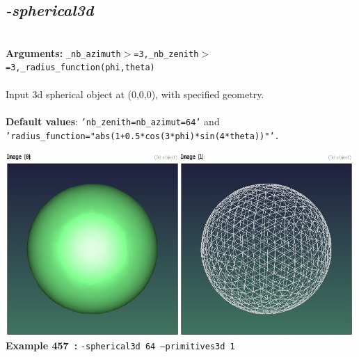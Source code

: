 \documentclass[a4paper,11pt,twoside]{book}
\begin{document}
\subsection{\emph{-spherical3d} }\vspace*{-0.5em}
~\\\textbf{Arguments: } 
{\small \texttt{\_nb\_azimuth$>$=3,\_nb\_zenith$>$=3,\_radius\_function(phi,theta)}}\\~\\
Input 3d spherical object at (0,0,0), with specified geometry.
~\\~\\\textbf{Default values}: {\small \texttt{'nb\_zenith=nb\_azimut=64'} and \texttt{'radius\_function="abs(1+0.5*cos(3*phi)*sin(4*theta))"'.}}
\begin{center}\includegraphics[keepaspectratio=true,height=7cm,width=\textwidth]{img/gmic_def457.jpg}\\
{\footnotesize \textbf{Example 457~:} \texttt{-spherical3d 64 --primitives3d 1}}
\end{center}
\end{document}
